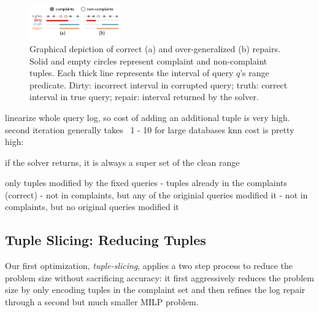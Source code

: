 \begin{figure}[t]
    \centering
    \includegraphics[width=0.35\textwidth]{figures/2nditerationgroups}
    \vspace*{-2mm}
    \caption{
      Graphical depiction of correct (a) and over-generalized (b) repairs.
      Solid and empty circles represent complaint and non-complaint tuples.
      Each thick line represents the interval of query $q$'s range predicate.
      Dirty: incorrect interval in corrupted query;
      truth: correct interval in true query;
      repair: interval returned by the solver.}
    \label{fig:groups}
\end{figure}



linearize whole query log, so cost of adding an additional tuple is very high.
second iteration generally takes ~1 - 10
for large databases knn cost is pretty high: ~

if the solver returns, it is always a super set of the clean range

only tuples modified by the fixed queries
- tuples already in the complaints (correct)
- not in complaints, but any of the originial queries modified it
- not in complaints, but no original queries modified it
\fi



\subsection{Tuple Slicing: Reducing Tuples}
\label{sec:opt:tbsize}


Our first optimization, \emph{tuple-slicing}, applies a two step process to reduce the 
problem size without sacrificing accuracy: it
first aggressively reduces
the problem size by only encoding tuples in the complaint set and then refines the log repair 
through a second but much smaller MILP problem. 

